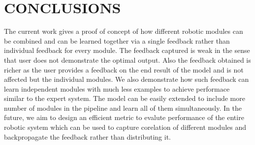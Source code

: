 \section{CONCLUSIONS}

The current work gives a proof of concept of how different robotic modules can be combined and can be learned together via a single feedback rather than individual feedback for every module. The feedback captured is weak in the sense that user does not demonstrate the optimal output. Also the feedback obtained is richer as the user provides a feedback on the end result of the model and is not affected but the individual modules. We also demonstrate how such feedback can learn independent modules with much less examples to achieve performace similar to the expert system. The model can be easily extended to include more number of modules in the pipeline and learn all of them simultaneously. In the future, we aim to design an efficient metric to evalute performance of the entire robotic system which can be used to capture corelation of different modules and backpropagate the feedback rather than distributing it.

